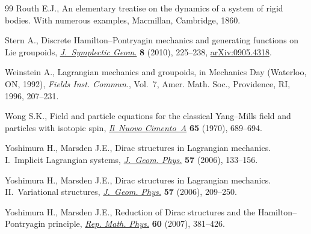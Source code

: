 \begin{thebibliography}{99}
Routh E.J., An elementary treatise on the dynamics of a system of rigid bodies.
 With numerous examples, Macmillan, Cambridge, 1860.

Stern A., Discrete {H}amilton--{P}ontryagin mechanics and generating functions
 on {L}ie groupoids, \href{https://doi.org/10.4310/JSG.2010.v8.n2.a5}{\textit{J.~Symplectic Geom.}} \textbf{8} (2010), 225--238,
 \href{http://arxiv.org/abs/0905.4318}{arXiv:0905.4318}.

Weinstein A., Lagrangian mechanics and groupoids, in Mechanics Day ({W}aterloo,
 {ON}, 1992), \textit{Fields Inst. Commun.}, Vol.~7, Amer. Math. Soc.,
 Providence, RI, 1996, 207--231.

Wong S.K., Field and particle equations for the classical {Y}ang--{M}ills f\/ield
 and particles with isotopic spin, \href{https://doi.org/10.1007/BF02892134}{\textit{Il~Nuovo Cimento~A}} \textbf{65}
 (1970), 689--694.

Yoshimura H., Marsden J.E., Dirac structures in {L}agrangian mechanics.
 {I}.~{I}mplicit {L}agrangian systems, \href{https://doi.org/10.1016/j.geomphys.2006.02.009}{\textit{J.~Geom. Phys.}} \textbf{57}
 (2006), 133--156.

Yoshimura H., Marsden J.E., Dirac structures in {L}agrangian mechanics.
 {II}.~{V}ariational structures, \href{https://doi.org/10.1016/j.geomphys.2006.02.012}{\textit{J.~Geom. Phys.}} \textbf{57} (2006),
 209--250.

Yoshimura H., Marsden J.E., Reduction of {D}irac structures and the {H}amilton--{P}ontryagin principle, \href{https://doi.org/10.1016/S0034-4877(08)00004-9}{\textit{Rep. Math. Phys.}} \textbf{60}
 (2007), 381--426.

\end{thebibliography}
